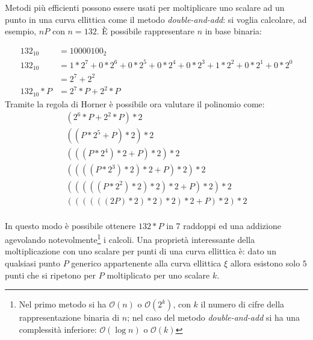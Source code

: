 Metodi più efficienti possono essere usati per moltiplicare uno scalare ad un punto in una curva ellittica come il metodo \textit{double-and-add}: si voglia calcolare, ad esempio, $nP$ con $n = 132$.
È possibile rappresentare $n$ in base binaria:

\begin{equation}
    \begin{split}
        132_{10} & = 10000100_2\\
        132_{10} & = 1* 2^7 + 0 * 2^6 + 0 * 2^5 + 0 * 2^4 + 0 * 2^3 + 1 * 2^2 + 0 * 2^1 + 0 * 2^0\\
                 & = 2^7 + 2^2\\
        132_{10} * P & = 2^7 * P + 2^2 * P
    \end{split}
\end{equation}
Tramite la regola di Horner è possibile ora valutare il polinomio come:
\begin{equation}
    \begin{split}
        (2^6*P + 2^2*P)*2\\
        ((P * 2^5 + P)*2)*2\\
        (((P * 2^4)*2 + P)*2)*2\\
        ((((P * 2^3)*2)*2 + P)*2)*2\\
        (((((P * 2^2)*2)*2)*2 + P)*2)*2\\
        ((((((2P)*2)*2)*2)*2 + P)*2)*2\\
    \end{split}
\end{equation}

In questo modo è possibile ottenere $132*P$ in 7 raddoppi ed una addizione agevolando notevolmente\footnote{Nel primo metodo si ha $\mathcal{O}(n)$ o $\mathcal{O}(2^k)$, con $k$ il numero di cifre della rappresentazione binaria di $n$; nel caso del metodo \textit{double-and-add} si ha una complessità inferiore: $\mathcal{O}(\log{}n)$ o $\mathcal{O}(k)$} i calcoli.\newline
Una proprietà interessante della moltiplicazione con uno scalare per punti di una curva ellittica è: dato un qualsiasi punto $P$ generico appartenente alla curva ellittica $\xi$ allora esistono solo $5$ punti che si ripetono per $P$ moltiplicato per uno scalare $k$.


